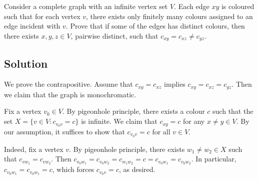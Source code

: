 Consider a complete graph with an infinite vertex set $V$.
Each edge $xy$ is coloured such that for each vertex $v$, there exists only finitely many colours assigned to an edge incident with $v$.
Prove that if some of the edges has distinct colours, then there exists $x, y, z \in V$, pairwise distinct, such that $c_{xy} = c_{xz} \neq c_{yz}$.


\subsection*{Solution}

We prove the contrapositive.
Assume that $c_{xy} = c_{xz}$ implies $c_{xy} = c_{xz} = c_{yz}$.
Then we claim that the graph is monochromatic.

Fix a vertex $v_0 \in V$.
By pigeonhole principle, there exists a colour $c$ such that the set $X = \{v \in V : c_{v_0 v} = c\}$ is infinite.
We claim that $c_{xy} = c$ for any $x \neq y \in V$.
By our assumption, it suffices to show that $c_{v_0 v} = c$ for all $v \in V$.

Indeed, fix a vertex $v$.
By pigeonhole principle, there exists $w_1 \neq w_2 \in X$ such that $c_{vw_1} = c_{vw_2}$.
Then $c_{v_0 w_1} = c_{v_0 w_2} = c_{w_1 w_2} = c = c_{v_0 w_1} = c_{v_0 w_2}$.
In particular, $c_{v_0 w_1} = c_{v_0 w_1} = c$, which forces $c_{v_0 v} = c$, as desired.
